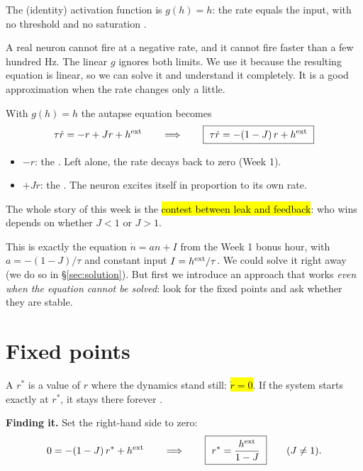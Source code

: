 \begin{defn}
The  (identity) activation function is $g(h)=h$: the rate equals the input, with no threshold and no saturation .
\end{defn}

\begin{pitfall}
A real neuron cannot fire at a negative rate, and it cannot fire faster than a few hundred Hz. The linear $g$ ignores both limits. We use it
because the resulting equation is linear, so we can solve it and understand it completely. It is a good approximation when the rate changes only a little.
\end{pitfall}

With $g(h)=h$ the autapse equation becomes
\[ \tau\dot r = -r + Jr + h^{\text{ext}} \qquad\Longrightarrow\qquad \boxed{\ \tau\dot r = -(1-J)\,r + h^{\text{ext}}\ } \]

\begin{intuition}
\begin{itemize}
  \item $-r$: the . Left alone, the rate decays back to zero (Week 1).
  \item $+Jr$: the . The neuron excites itself in proportion to its own rate.
\end{itemize}
The whole story of this week is the \hl{contest between leak and feedback}: who wins depends on whether $J<1$ or $J>1$.
\end{intuition}

This is exactly the equation $\dot n = an + I$ from the Week 1 bonus hour, with $a = -(1-J)/\tau$ and constant input $I=h^{\text{ext}}/\tau$. We could solve it right away
(we do so in \S\ref{sec:solution}). But first we introduce an approach that works \emph{even when the equation cannot be solved}: look for the fixed points and ask whether they are stable.

\section{Fixed points}

\begin{defn}
A  $r^*$ is a value of $r$ where the dynamics stand still: \hl{$\dot r = 0$}. If the system starts exactly at $r^*$, it stays there forever .
\end{defn}

\textbf{Finding it.} Set the right-hand side to zero:
\[ 0 = -(1-J)\,r^* + h^{\text{ext}} \qquad\Longrightarrow\qquad \boxed{\ r^* = \frac{h^{\text{ext}}}{1-J}\ }\qquad (J\neq1). \]

